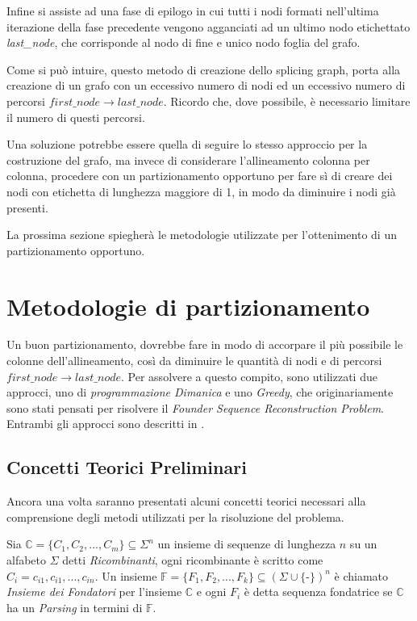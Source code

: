 Infine si assiste ad una fase di epilogo in cui tutti i nodi formati nell'ultima iterazione della fase precedente vengono agganciati ad un ultimo nodo etichettato \textit{last\_node}, che corrisponde al nodo di fine e unico nodo foglia del grafo.

Come si può intuire, questo metodo di creazione dello splicing graph, porta alla creazione di un grafo con un eccessivo numero di nodi ed un eccessivo numero di percorsi $first\_node \to last\_node$. Ricordo che, dove possibile, è necessario limitare il numero di questi percorsi.

Una soluzione potrebbe essere quella di seguire lo stesso approccio per la costruzione del grafo, ma invece di considerare l'allineamento colonna per colonna, procedere con un partizionamento opportuno per fare sì di creare dei nodi con etichetta di lunghezza maggiore di 1, in modo da diminuire i nodi già presenti.

La prossima sezione spiegherà le metodologie utilizzate per l'ottenimento di un partizionamento opportuno.

\newpage

\section{Metodologie di partizionamento}
Un buon partizionamento, dovrebbe fare in modo di accorpare il più possibile le colonne dell'allineamento, così da diminuire le quantità di nodi e di percorsi $first\_node \to last\_node$. Per assolvere a questo compito, sono utilizzati due approcci, uno di \textit{programmazione Dimanica} e uno \textit{Greedy}, che originariamente sono stati pensati per risolvere il \textit{Founder Sequence Reconstruction Problem}. Entrambi gli approcci sono descritti in \cite{ukkonen}.

\subsection{Concetti Teorici Preliminari}
Ancora una volta saranno presentati alcuni concetti teorici necessari alla comprensione degli metodi utilizzati per la risoluzione del problema.

Sia $\mathbb{C}=\{C_1,C_2,...,C_m\} \subseteq \Sigma^n$ un insieme di sequenze di lunghezza $n$ su un alfabeto $\Sigma$ detti \textit{Ricombinanti}, ogni ricombinante è scritto come $C_i=c_{i1},c_{i1},...,c_{in}$. Un insieme $\mathbb{F}=\{F_1,F_2,...,F_k\} \subseteq (\Sigma \cup \{\textit{-}\})^n$ è chiamato \textit{Insieme dei Fondatori} per
l'insieme $\mathbb{C}$ e ogni $F_i$ è detta sequenza fondatrice se $\mathbb{C}$ ha un \textit{Parsing} in termini di $\mathbb{F}$. 

